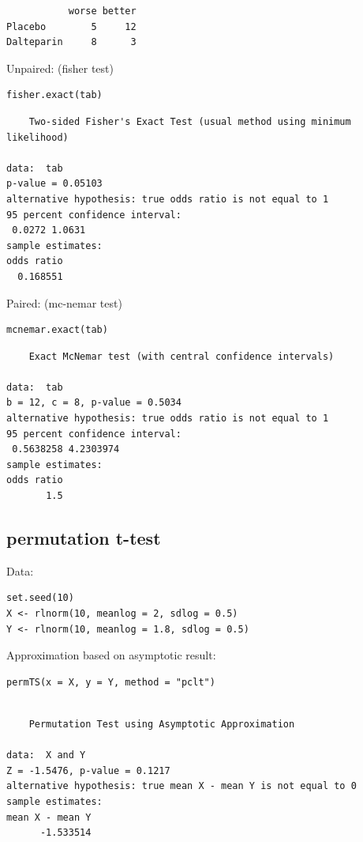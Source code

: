 \documentclass{article}
\begin{document}
\begin{verbatim}
           worse better
Placebo        5     12
Dalteparin     8      3
\end{verbatim}

Unpaired: (fisher test)
\lstset{language=r,label= ,caption= ,captionpos=b,numbers=none}
\begin{lstlisting}
fisher.exact(tab)
\end{lstlisting}

\begin{verbatim}
	Two-sided Fisher's Exact Test (usual method using minimum likelihood)

data:  tab
p-value = 0.05103
alternative hypothesis: true odds ratio is not equal to 1
95 percent confidence interval:
 0.0272 1.0631
sample estimates:
odds ratio 
  0.168551
\end{verbatim}


Paired: (mc-nemar test)
\lstset{language=r,label= ,caption= ,captionpos=b,numbers=none}
\begin{lstlisting}
mcnemar.exact(tab)
\end{lstlisting}

\begin{verbatim}
	Exact McNemar test (with central confidence intervals)

data:  tab
b = 12, c = 8, p-value = 0.5034
alternative hypothesis: true odds ratio is not equal to 1
95 percent confidence interval:
 0.5638258 4.2303974
sample estimates:
odds ratio 
       1.5
\end{verbatim}

\subsection{permutation t-test}
\label{sec:orgb234a23}

Data:
\lstset{language=r,label= ,caption= ,captionpos=b,numbers=none}
\begin{lstlisting}
set.seed(10)
X <- rlnorm(10, meanlog = 2, sdlog = 0.5)
Y <- rlnorm(10, meanlog = 1.8, sdlog = 0.5)
\end{lstlisting}

Approximation based on asymptotic result:
\lstset{language=r,label= ,caption= ,captionpos=b,numbers=none}
\begin{lstlisting}
permTS(x = X, y = Y, method = "pclt")
\end{lstlisting}

\begin{verbatim}

	Permutation Test using Asymptotic Approximation

data:  X and Y
Z = -1.5476, p-value = 0.1217
alternative hypothesis: true mean X - mean Y is not equal to 0
sample estimates:
mean X - mean Y 
      -1.533514
\end{verbatim}
\end{document}
